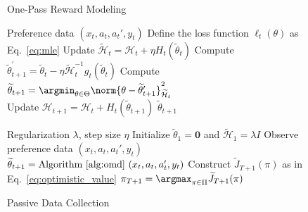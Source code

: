 \begin{figure*}[t]
  \centering
  \begin{minipage}[t]{0.48\textwidth}
    \begin{algorithm}[H]
      \caption{One-Pass Reward Modeling}
      \label{alg:omd}
    \begin{algorithmic}[1]
      \REQUIRE Preference data $(x_t, a_t, a_t', y_t)$
      \STATE Define the loss function $\ell_t(\theta)$ as Eq.~\eqref{eq:mle}
      \STATE Update $\widetilde{\mathcal{H}}_t = \mathcal{H}_t + \eta H_t(\widetilde{\theta}_t)$
      \STATE Compute $\widetilde{\theta}_{t+1}^{\prime} = \widetilde{\theta}_t - \eta \widetilde{\mathcal{H}}_t^{-1} g_t(\widetilde{\theta}_t)$
      \STATE Compute $\widetilde{\theta}_{t+1} = \argmin_{\theta \in \Theta} \norm{\theta - \widetilde{\theta}_{t+1}^{\prime}}_{\widetilde{\mathcal{H}}_t}^2$ \\
      \STATE Update $\mathcal{H}_{t+1} = \mathcal{H}_{t} + H_t(\widetilde{\theta}_{t+1})$
      \ENSURE $\widetilde{\theta}_{t+1}$
    \end{algorithmic}
  \end{algorithm}
  \end{minipage}
  \hfill
  \begin{minipage}[t]{0.48\textwidth}
  \begin{algorithm}[H]
    \caption{Passive Data Collection}
    \label{alg:passive}
    \begin{algorithmic}[1]
      \REQUIRE Regularization $\lambda$, step size $\eta$
      \STATE Initialize $\widetilde{\theta}_1 = \bm{0}$ and $\widetilde{\mathcal{H}}_1 = \lambda I$
        \STATE Observe preference data $(x_t, a_t, a_t', y_t)$
        \STATE $\widetilde{\theta}_{t+1} = \text{Algorithm~\ref{alg:omd} } (x_t, a_t, a_t', y_t)$
      \ENDFOR
      \STATE Construct $\widetilde{J}_{T+1}(\pi)$ as in Eq.~\eqref{eq:optimistic_value}
      \ENSURE $\pi_{T+1} = \argmax_{\pi \in \Pi} \widetilde{J}_{T+1}(\pi)$
    \end{algorithmic}
  \end{algorithm}
\end{minipage}
\vspace{-3mm}
\end{figure*}

